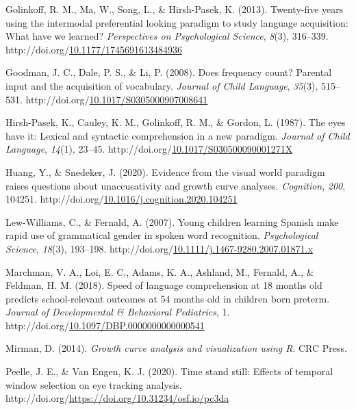 \documentclass[10pt, letterpaper]{article}
\begin{document}
\begin{CSLReferences}{1}{0}
\leavevmode\hypertarget{ref-Golinkoff2013}{}%
Golinkoff, R. M., Ma, W., Song, L., \& Hirsh-Pasek, K. (2013).
{Twenty-five years using the intermodal preferential looking paradigm to
study language acquisition: What have we learned?} \emph{Perspectives on
Psychological Science}, \emph{8}(3), 316--339.
http://doi.org/\href{https://doi.org/10.1177/1745691613484936}{10.1177/1745691613484936}

\leavevmode\hypertarget{ref-Goodman2008}{}%
Goodman, J. C., Dale, P. S., \& Li, P. (2008). {Does frequency count?
Parental input and the acquisition of vocabulary}. \emph{Journal of
Child Language}, \emph{35}(3), 515--531.
http://doi.org/\href{https://doi.org/10.1017/S0305000907008641}{10.1017/S0305000907008641}

\leavevmode\hypertarget{ref-Hirsh-Pasek1987}{}%
Hirsh-Pasek, K., Cauley, K. M., Golinkoff, R. M., \& Gordon, L. (1987).
{The eyes have it: Lexical and syntactic comprehension in a new
paradigm}. \emph{Journal of Child Language}, \emph{14}(1), 23--45.
http://doi.org/\href{https://doi.org/10.1017/S030500090001271X}{10.1017/S030500090001271X}

\leavevmode\hypertarget{ref-Huang2020}{}%
Huang, Y., \& Snedeker, J. (2020). {Evidence from the visual world
paradigm raises questions about unaccusativity and growth curve
analyses}. \emph{Cognition}, \emph{200}, 104251.
http://doi.org/\href{https://doi.org/10.1016/j.cognition.2020.104251}{10.1016/j.cognition.2020.104251}

\leavevmode\hypertarget{ref-Lew-Williams2007}{}%
Lew-Williams, C., \& Fernald, A. (2007). {Young children learning
Spanish make rapid use of grammatical gender in spoken word
recognition}. \emph{Psychological Science}, \emph{18}(3), 193--198.
http://doi.org/\href{https://doi.org/10.1111/j.1467-9280.2007.01871.x}{10.1111/j.1467-9280.2007.01871.x}

\leavevmode\hypertarget{ref-Marchman2018}{}%
Marchman, V. A., Loi, E. C., Adams, K. A., Ashland, M., Fernald, A., \&
Feldman, H. M. (2018). {Speed of language comprehension at 18 months old
predicts school-relevant outcomes at 54 months old in children born
preterm}. \emph{Journal of Developmental {\&} Behavioral Pediatrics}, 1.
http://doi.org/\href{https://doi.org/10.1097/DBP.0000000000000541}{10.1097/DBP.0000000000000541}

\leavevmode\hypertarget{ref-Mirman2014}{}%
Mirman, D. (2014). \emph{{Growth curve analysis and visualization using
R}}. CRC Press.

\leavevmode\hypertarget{ref-Peelle2020}{}%
Peelle, J. E., \& Van Engen, K. J. (2020). {Time stand still: Effects of
temporal window selection on eye tracking analysis}.
http://doi.org/\url{https://doi.org/10.31234/osf.io/pc3da}


\end{CSLReferences}
\end{document}
